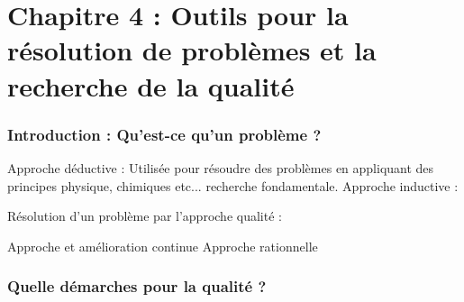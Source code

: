 \part{Chapitre 4 : Outils pour la résolution de problèmes et la recherche de la qualité}

\section{Introduction : Qu’est-ce qu’un problème ?}

Approche déductive : Utilisée pour résoudre des problèmes en appliquant des principes physique, chimiques etc... recherche fondamentale.
Approche inductive :

Résolution d’un problème par l’approche qualité :

Approche et amélioration continue
Approche rationnelle

\section{Quelle démarches pour la qualité ?}

